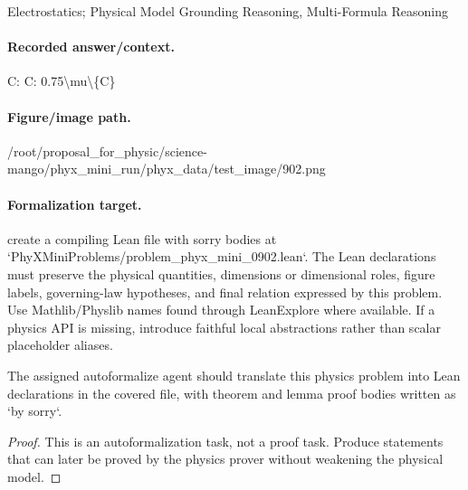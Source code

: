Electrostatics; Physical Model Grounding Reasoning, Multi-Formula Reasoning

\paragraph{Recorded answer/context.}
C: C: 0.75\textbackslash{}mu\textbackslash{}\{C\}

\paragraph{Figure/image path.}
/root/proposal\_for\_physic/science-mango/phyx\_mini\_run/phyx\_data/test\_image/902.png

\paragraph{Formalization target.}
create a compiling Lean file with sorry bodies at `PhyXMiniProblems/problem\_phyx\_mini\_0902.lean`. The Lean declarations must preserve the physical quantities, dimensions or dimensional roles, figure labels, governing-law hypotheses, and final relation expressed by this problem.
Use Mathlib/Physlib names found through LeanExplore where available. If a physics API is missing, introduce faithful local abstractions rather than scalar placeholder aliases.

\begin{theorem}
\label{thm:physics:phyx_mini_0902:target}
The assigned autoformalize agent should translate this physics problem into Lean declarations in the covered file, with theorem and lemma proof bodies written as `by sorry`.
\end{theorem}
\begin{proof}
This is an autoformalization task, not a proof task. Produce statements that can later be proved by the physics prover without weakening the physical model.
\end{proof}

